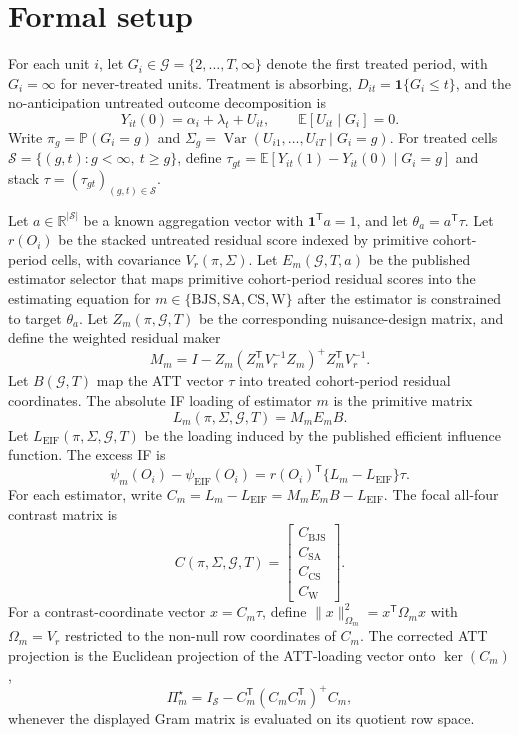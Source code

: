 \documentclass[11pt]{article}
\newcommand{\E}{\mathbb{E}}
\renewcommand{\Pr}{\mathbb{P}}
\newcommand{\one}{\mathbf{1}}
\newcommand{\transpose}{\mathsf{T}}
\newcommand{\R}{\mathbb{R}}
\theoremstyle{definition}
\theoremstyle{plain}
\theoremstyle{remark}
\begin{document}
\section{Formal setup}
For each unit $i$, let $G_i\in\mathcal G=\{2,\ldots,T,\infty\}$ denote the
first treated period, with $G_i=\infty$ for never-treated units.  Treatment is
absorbing, $D_{it}=\one\{G_i\le t\}$, and the no-anticipation untreated
outcome decomposition is
\[
  Y_{it}(0)=\alpha_i+\lambda_t+U_{it},\qquad
  \E[U_{it}\mid G_i]=0 .
\]
Write $\pi_g=\Pr(G_i=g)$ and
$\Sigma_g=\operatorname{Var}(U_{i1},\ldots,U_{iT}\mid G_i=g)$.  For treated
cells $\mathcal S=\{(g,t):g<\infty,\ t\ge g\}$, define
$\tau_{gt}=\E[Y_{it}(1)-Y_{it}(0)\mid G_i=g]$ and stack
$\tau=(\tau_{gt})_{(g,t)\in\mathcal S}$.

Let $a\in\R^{|\mathcal S|}$ be a known aggregation vector with
$\one^\transpose a=1$, and let $\theta_a=a^\transpose\tau$.  Let
$r(O_i)$ be the stacked untreated residual score indexed by primitive
cohort-period cells, with covariance $V_r(\pi,\Sigma)$.  Let
$E_m(\mathcal G,T,a)$ be the published estimator selector that maps primitive
cohort-period residual scores into the estimating equation for
$m\in\{\mathrm{BJS},\mathrm{SA},\mathrm{CS},\mathrm{W}\}$ after the estimator
is constrained to target $\theta_a$.  Let
$Z_m(\pi,\mathcal G,T)$ be the corresponding nuisance-design matrix, and
define the weighted residual maker
\[
  M_m=I-Z_m(Z_m^\transpose V_r^{-1}Z_m)^+Z_m^\transpose V_r^{-1}.
\]
Let $B(\mathcal G,T)$ map the ATT vector $\tau$ into treated
cohort-period residual coordinates.  The absolute IF loading of estimator
$m$ is the primitive matrix
\[
  L_m(\pi,\Sigma,\mathcal G,T)=M_mE_mB .
\]
Let $L_{\mathrm{EIF}}(\pi,\Sigma,\mathcal G,T)$ be the loading induced by the
published efficient influence function.  The excess IF is
\[
  \psi_m(O_i)-\psi_{\mathrm{EIF}}(O_i)
  =r(O_i)^\transpose\{L_m-L_{\mathrm{EIF}}\}\tau .
\]
For each estimator, write
$C_m=L_m-L_{\mathrm{EIF}}=M_mE_mB-L_{\mathrm{EIF}}$.  The focal all-four
contrast matrix is
\[
  C(\pi,\Sigma,\mathcal G,T)=
  \begin{bmatrix}
  C_{\mathrm{BJS}}\\
  C_{\mathrm{SA}}\\
  C_{\mathrm{CS}}\\
  C_{\mathrm{W}}
  \end{bmatrix}.
\]
For a contrast-coordinate vector $x=C_m\tau$, define
$\|x\|_{\Omega_m}^{2}=x^\transpose \Omega_m x$ with
$\Omega_m=V_r$ restricted to the non-null row coordinates of $C_m$.  The
corrected ATT projection is the Euclidean projection of the ATT-loading vector
onto $\ker(C_m)$,
\[
  \Pi_m^\star
  =I_{\mathcal S}-C_m^\transpose(C_m C_m^\transpose)^+C_m,
\]
whenever the displayed Gram matrix is evaluated on its quotient row space.
\end{document}
